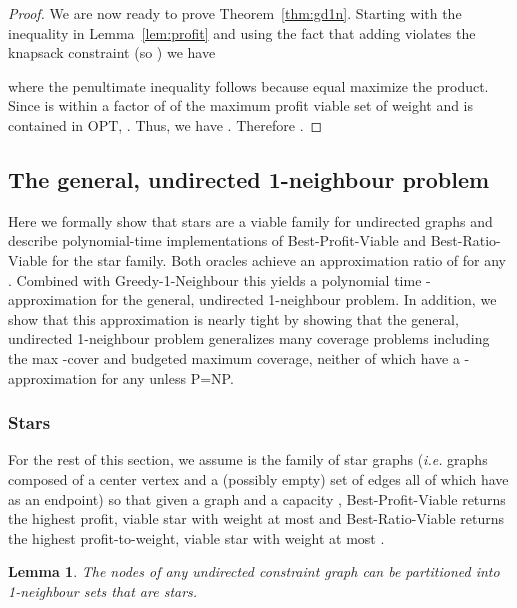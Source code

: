 \documentclass[12pt]{article}
\newtheorem{lemma}[theorem]{Lemma}
\newcommand{\OPT}{\ensuremath{\mathrm{OPT}\xspace}}
\begin{document}
\begin{proof}
We are now ready to prove Theorem~\ref{thm:gd1n}.  Starting with the inequality in Lemma~\ref{lem:profit} and using
the fact that adding  violates the knapsack constraint (so
) we have

where the penultimate inequality follows because equal  maximize the product.  Since  is within a factor of  of the maximum profit viable set of weight  and  is contained in \OPT,
.  Thus, we have .  Therefore
.

\hfill
\end{proof}













\subsection{The general, undirected 1-neighbour problem} \label{sec:gu1n}

Here we formally show that stars are a viable family for undirected
graphs and describe polynomial-time implementations of {\sc
Best-Profit-Viable} and {\sc Best-Ratio-Viable} for the star family.  Both oracles achieve an approximation ratio of  for any .  Combined with {\sc Greedy-1-Neighbour} this yields a polynomial time -approximation for the general, undirected 1-neighbour problem.  In addition, we show that this approximation is nearly tight by showing that the general, undirected 1-neighbour problem generalizes many coverage problems including the max -cover and budgeted maximum coverage, neither of which have a -approximation for any  unless P=NP.

\subsubsection{Stars} \label{sec:stars}

For the rest of this section, we assume  is the family of
star graphs ({\em i.e.} graphs composed of a center vertex  and a (possibly empty) set of edges all of which have  as an endpoint) so that
given a graph  and a capacity , {\sc Best-Profit-Viable} returns
the highest profit, viable star with weight at most  and {\sc Best-Ratio-Viable} returns the highest profit-to-weight, viable star with weight at most .

\begin{lemma}\label{lem:graphs-into-stars}
The nodes of any undirected constraint graph  can be partitioned into 1-neighbour sets that are stars.
\end{lemma}
\end{document}
